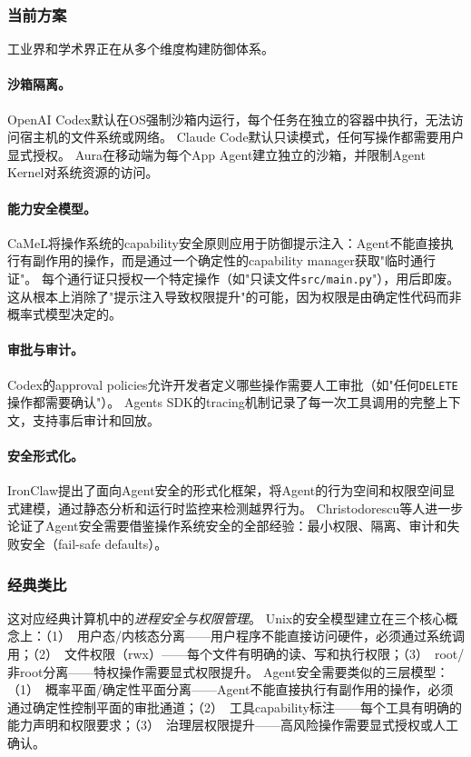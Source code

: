 \subsubsection{当前方案}
工业界和学术界正在从多个维度构建防御体系。

\paragraph{沙箱隔离。}
OpenAI Codex默认在OS强制沙箱内运行，每个任务在独立的容器中执行，无法访问宿主机的文件系统或网络\cite{openai_codex_sandbox_2026}。
Claude Code默认只读模式，任何写操作都需要用户显式授权\cite{anthropic_claudecode_security_2026}。
Aura在移动端为每个App Agent建立独立的沙箱，并限制Agent Kernel对系统资源的访问\cite{aura2025}。

\paragraph{能力安全模型。}
CaMeL\cite{debenedetti2025camel}将操作系统的capability安全原则应用于防御提示注入：Agent不能直接执行有副作用的操作，而是通过一个确定性的capability manager获取"临时通行证"。
每个通行证只授权一个特定操作（如"只读文件\texttt{src/main.py}"），用后即废。
这从根本上消除了"提示注入导致权限提升"的可能，因为权限是由确定性代码而非概率式模型决定的。

\paragraph{审批与审计。}
Codex的approval policies\cite{openai_codex_approvals_2026}允许开发者定义哪些操作需要人工审批（如"任何\texttt{DELETE}操作都需要确认"）。
Agents SDK的tracing机制\cite{openai_codex_agentsdk_2026}记录了每一次工具调用的完整上下文，支持事后审计和回放。

\paragraph{安全形式化。}
IronClaw\cite{ironclaw2025}提出了面向Agent安全的形式化框架，将Agent的行为空间和权限空间显式建模，通过静态分析和运行时监控来检测越界行为。
Christodorescu等人\cite{agenticsecurity2025}进一步论证了Agent安全需要借鉴操作系统安全的全部经验：最小权限、隔离、审计和失败安全（fail-safe defaults）。

\subsubsection{经典类比}
这对应经典计算机中的\emph{进程安全与权限管理}。
Unix的安全模型建立在三个核心概念上：（1）~用户态/内核态分离——用户程序不能直接访问硬件，必须通过系统调用\cite{ostep_2023}；（2）~文件权限（rwx）——每个文件有明确的读、写和执行权限；（3）~root/非root分离——特权操作需要显式权限提升。
Agent安全需要类似的三层模型：（1）~概率平面/确定性平面分离——Agent不能直接执行有副作用的操作，必须通过确定性控制平面的审批通道；（2）~工具capability标注——每个工具有明确的能力声明和权限要求；（3）~治理层权限提升——高风险操作需要显式授权或人工确认。

